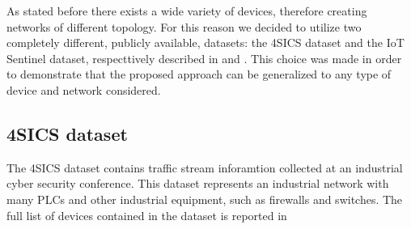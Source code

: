 As stated before there exists a wide variety of devices, therefore creating networks of different topology. For this reason we decided to utilize two completely different, publicly available, datasets: the 4SICS dataset and the IoT Sentinel dataset, respecttively described in  and . This choice was made in order to demonstrate that the proposed approach can be generalized to any type of device and network considered.

\subsection{4SICS dataset}\label{4sics_sec}

The {4SICS dataset}\cite{4sics_site} contains traffic stream inforamtion collected at an industrial cyber security conference. This dataset represents an industrial network with many PLCs and other industrial equipment, such as firewalls and switches. The full list of devices contained in the dataset is reported in 

